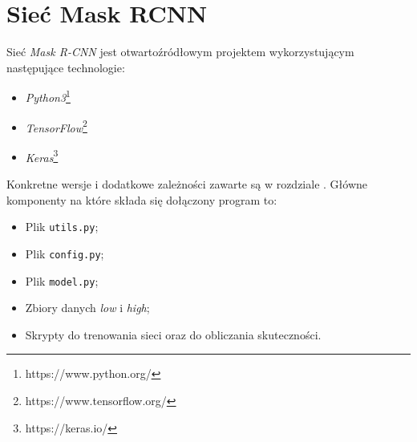 \newpage
\section{Sieć Mask RCNN}

Sieć \textit{Mask R-CNN} \cite{matterport-mask-rcnn} jest otwartoźródłowym projektem wykorzystującym następujące technologie:
\begin{itemize}
  \item \textit{Python3}\footnote{https://www.python.org/}
  \item \textit{TensorFlow}\footnote{https://www.tensorflow.org/}
  \item \textit{Keras}\footnote{https://keras.io/}
\end{itemize}

Konkretne wersje i dodatkowe zależności zawarte są w rozdziale . Główne komponenty na które składa się dołączony program to:

\begin{itemize}
\item Plik \texttt{utils.py};
  \item Plik \texttt{config.py};
  \item Plik  \texttt{model.py};
  \item Zbiory danych \textit{low} i \textit{high};
  \item Skrypty do trenowania sieci oraz do obliczania skuteczności.
\end{itemize}
